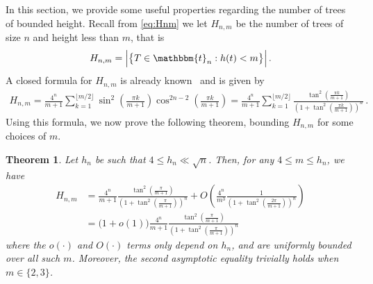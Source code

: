 \documentclass{article}
\newcommand{\bbt}{\mathbbm{t}}
\newcommand{\1}{\mathbbm{1}}								%
\newtheorem{theorem}{Theorem}[section]
\theoremstyle{definition}
\numberwithin{equation}{section}
\begin{document}
In this section, we provide some useful properties regarding the number of trees of bounded height.
Recall from \eqref{eq:Hnm} we let $H_{n,m}$ be the number of trees of size $n$ and height less than $m$, that is
\begin{align*}
    H_{n,m}=\Big|\big\{T\in\bbt_n:h(t)<m\big\}\Big|\,.
\end{align*}
A closed formula for $H_{n,m}$ is already known~\cite[(14)]{de1972average} and is given by
\begin{align}\label{eq:ht-bdd tree}
    H_{n,m}=\frac{4^n}{m+1}\sum_{k=1}^{\lfloor m/2\rfloor}\sin^2\left(\frac{\pi k}{m+1}\right)\cos^{2n-2}\left(\frac{\pi k}{m+1}\right)=\frac{4^n}{m+1}\sum_{k=1}^{\lfloor m/2\rfloor}\frac{\tan^2\left(\frac{\pi k}{m+1}\right)}{\left(1+\tan^2\left(\frac{\pi k}{m+1}\right)\right)^n}\,.
\end{align}
Using this formula, we now prove the following theorem, bounding $H_{n,m}$ for some choices of $m$.

\begin{theorem}\label{thm:ht-bdd tree}
    Let $h_n$ be such that $4\leq h_n\ll\sqrt{n}$.
    Then, for any $4\leq m\leq h_n$, we have
    \begin{align*}
        H_{n,m}&=\frac{4^n}{m+1}\frac{\tan^2\left(\frac{\pi}{m+1}\right)}{\left(1+\tan^2\left(\frac{\pi}{m+1}\right)\right)^n}+O\left(\frac{4^n}{m^3}\frac{1}{\left(1+\tan^2\left(\frac{2\pi}{m+1}\right)\right)^n}\right)\\
        &=\big(1+o(1)\big)\frac{4^n}{m+1}\frac{\tan^2\left(\frac{\pi}{m+1}\right)}{\left(1+\tan^2\left(\frac{\pi}{m+1}\right)\right)^n}
    \end{align*}
    where the $o(\cdot)$ and $O(\cdot)$ terms only depend on $h_n$, and are uniformly bounded over all such $m$.
    Moreover, the second asymptotic equality trivially holds when $m\in\{2,3\}$.
\end{theorem}
\end{document}
